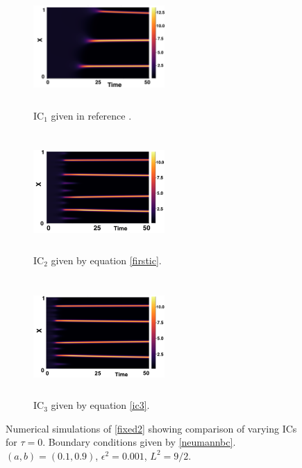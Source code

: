 \begin{figure}[H]
    \centering
    \begin{subfigure}[t]{0.32\textwidth}
        \centering
        \includegraphics[width=5cm,height=4.5cm]{gaff0.png}
        \caption{$\text{IC}_1$ given in reference \cite{gaffmonk}.}
        \label{}
    \end{subfigure}
    \hfill
    \begin{subfigure}[t]{0.32\textwidth}
        \centering
        \includegraphics[width=5cm,height=4.5cm]{ic20.png}
        \caption{$\text{IC}_2$ given by equation \eqref{firstic}.}
        \label{}
    \end{subfigure}
    \hfill
    \begin{subfigure}[t]{0.32\textwidth}
        \centering
        \includegraphics[width=5cm,height=4.5cm]{ic30.png}
        \caption{$\text{IC}_3$ given by equation \eqref{ic3}.}
        \label{}
    \end{subfigure}
    \caption{Numerical simulations of \eqref{fixed2} showing comparison of varying ICs for $\tau=0$. Boundary conditions given by \eqref{neumannbc}. $(a,b)=(0.1,0.9)$, $\epsilon^2=0.001$, $L^2=9/2$. }
    \label{fig:figtau0}
\end{figure}

